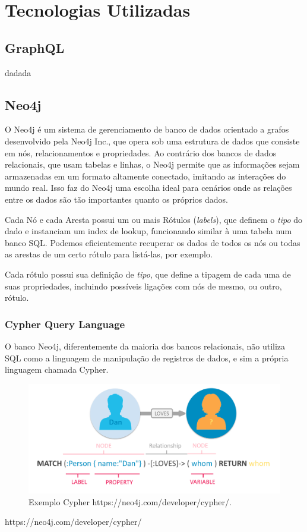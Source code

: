 \chapter{Tecnologias Utilizadas}
\label{chap3}

\section{GraphQL}

dadada


\section{Neo4j}
O Neo4j é um sistema de gerenciamento de banco de dados orientado a grafos desenvolvido pela Neo4j Inc., que opera sob uma estrutura de dados que consiste em nós, relacionamentos e propriedades. Ao contrário dos bancos de dados relacionais, que usam tabelas e linhas, o Neo4j permite que as informações sejam armazenadas em um formato altamente conectado, imitando as interações do mundo real. Isso faz do Neo4j uma escolha ideal para cenários onde as relações entre os dados são tão importantes quanto os próprios dados.

 
Cada Nó e cada Aresta possui um ou mais Rótulos (\textit{labels}), que definem o \textit{tipo} do dado e instanciam um index de lookup, funcionando similar à uma tabela num banco SQL. Podemos eficientemente recuperar os dados de todos os nós ou todas as arestas de um certo rótulo para listá-las, por exemplo.

Cada rótulo possui sua definição de \textit{tipo}, que define a tipagem de cada uma de suas propriedades, incluindo possíveis ligações com nós de mesmo, ou outro, rótulo.

\subsection{Cypher Query Language}

O banco Neo4j, diferentemente da maioria dos bancos relacionais, não utiliza SQL como a linguagem de manipulação de registros de dados, e sim a própria linguagem chamada Cypher.

\begin{figure}[H]
    \centering
    \includegraphics[width=1.0\linewidth]{Imagens/chap03/cypher-exemple.png}
    \caption{Exemplo Cypher https://neo4j.com/developer/cypher/.}
    \label{fig:profile-exemple}
\end{figure}
https://neo4j.com/developer/cypher/


